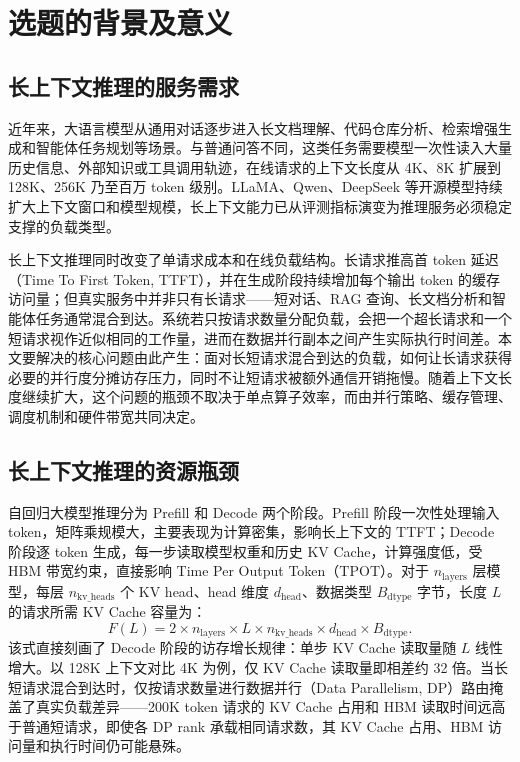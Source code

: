 
\section{选题的背景及意义}

\subsection{长上下文推理的服务需求}

近年来，大语言模型从通用对话逐步进入长文档理解、代码仓库分析、检索增强生成和智能体任务规划等场景。与普通问答不同，这类任务需要模型一次性读入大量历史信息、外部知识或工具调用轨迹，在线请求的上下文长度从 4K、8K 扩展到 128K、256K 乃至百万 token 级别。LLaMA、Qwen、DeepSeek 等开源模型持续扩大上下文窗口和模型规模\citep{touvron2023llama,touvron2023llama2,dubey2024llama3,yang2024qwen2,yang2025qwen25,deepseekai2024deepseekv2,deepseekai2025deepseekv3,deepseekai2025deepseekr1}，长上下文能力已从评测指标演变为推理服务必须稳定支撑的负载类型。

长上下文推理同时改变了单请求成本和在线负载结构。长请求推高首 token 延迟（Time To First Token, TTFT），并在生成阶段持续增加每个输出 token 的缓存访问量；但真实服务中并非只有长请求——短对话、RAG 查询、长文档分析和智能体任务通常混合到达。系统若只按请求数量分配负载，会把一个超长请求和一个短请求视作近似相同的工作量，进而在数据并行副本之间产生实际执行时间差。本文要解决的核心问题由此产生：面对长短请求混合到达的负载，如何让长请求获得必要的并行度分摊访存压力，同时不让短请求被额外通信开销拖慢。随着上下文长度继续扩大，这个问题的瓶颈不取决于单点算子效率，而由并行策略、缓存管理、调度机制和硬件带宽共同决定。

\subsection{长上下文推理的资源瓶颈}

自回归大模型推理分为 Prefill 和 Decode 两个阶段。Prefill 阶段一次性处理输入 token，矩阵乘规模大，主要表现为计算密集，影响长上下文的 TTFT；Decode 阶段逐 token 生成，每一步读取模型权重和历史 KV Cache，计算强度低，受 HBM 带宽约束，直接影响 Time Per Output Token（TPOT）。对于 $n_\text{layers}$ 层模型，每层 $n_\text{kv\_heads}$ 个 KV head、head 维度 $d_\text{head}$、数据类型 $B_\text{dtype}$ 字节，长度 $L$ 的请求所需 KV Cache 容量为：
\[
F(L)=2 \times n_\text{layers} \times L \times n_\text{kv\_heads} \times d_\text{head} \times B_\text{dtype}.
\]
该式直接刻画了 Decode 阶段的访存增长规律：单步 KV Cache 读取量随 $L$ 线性增大。以 128K 上下文对比 4K 为例，仅 KV Cache 读取量即相差约 32 倍。当长短请求混合到达时，仅按请求数量进行数据并行（Data Parallelism, DP）路由掩盖了真实负载差异——200K token 请求的 KV Cache 占用和 HBM 读取时间远高于普通短请求，即使各 DP rank 承载相同请求数，其 KV Cache 占用、HBM 访问量和执行时间仍可能悬殊。


